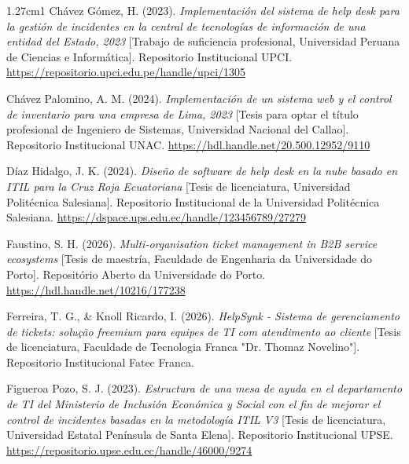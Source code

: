 \begin{hangparas}{1.27cm}{1}
Chávez Gómez, H. (2023). \textit{Implementación del sistema de help desk para la gestión de incidentes en la central de tecnologías de información de una entidad del Estado, 2023} [Trabajo de suficiencia profesional, Universidad Peruana de Ciencias e Informática]. Repositorio Institucional UPCI. \url{https://repositorio.upci.edu.pe/handle/upci/1305}

\vspace{0.8em}

Chávez Palomino, A. M. (2024). \textit{Implementación de un sistema web y el control de inventario para una empresa de Lima, 2023} [Tesis para optar el título profesional de Ingeniero de Sistemas, Universidad Nacional del Callao]. Repositorio Institucional UNAC. \url{https://hdl.handle.net/20.500.12952/9110}

\vspace{0.8em}

Díaz Hidalgo, J. K. (2024). \textit{Diseño de software de help desk en la nube basado en ITIL para la Cruz Roja Ecuatoriana} [Tesis de licenciatura, Universidad Politécnica Salesiana]. Repositorio Institucional de la Universidad Politécnica Salesiana. \url{https://dspace.ups.edu.ec/handle/123456789/27279}

\vspace{0.8em}

Faustino, S. H. (2026). \textit{Multi-organisation ticket management in B2B service ecosystems} [Tesis de maestría, Faculdade de Engenharia da Universidade do Porto]. Repositório Aberto da Universidade do Porto. \url{https://hdl.handle.net/10216/177238}

\vspace{0.8em}

Ferreira, T. G., \& Knoll Ricardo, I. (2026). \textit{HelpSynk - Sistema de gerenciamento de tickets: solução freemium para equipes de TI com atendimento ao cliente} [Tesis de licenciatura, Faculdade de Tecnologia Franca "Dr. Thomaz Novelino"]. Repositorio Institucional Fatec Franca.

\vspace{0.8em}

Figueroa Pozo, S. J. (2023). \textit{Estructura de una mesa de ayuda en el departamento de TI del Ministerio de Inclusión Económica y Social con el fin de mejorar el control de incidentes basadas en la metodología ITIL V3} [Tesis de licenciatura, Universidad Estatal Península de Santa Elena]. Repositorio Institucional UPSE. \url{https://repositorio.upse.edu.ec/handle/46000/9274}


\end{hangparas}
